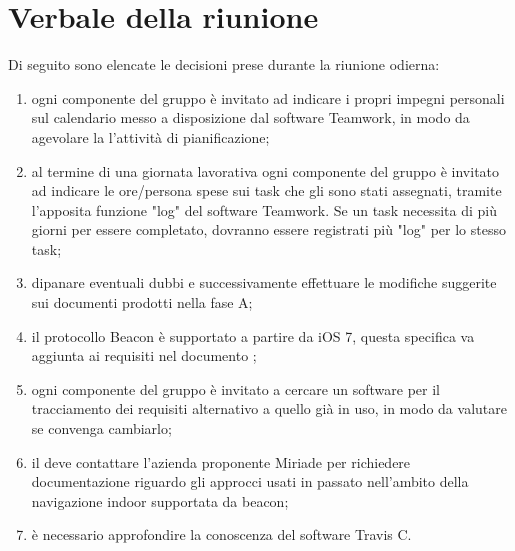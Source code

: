 \documentclass[../RiunioneInterna16-02-19.tex]{subfiles}
\begin{document}
\section{Verbale della riunione}
Di seguito sono elencate le decisioni prese durante la riunione odierna:
\begin{enumerate}
	\item ogni componente del gruppo è invitato ad indicare i propri impegni personali sul calendario messo a disposizione dal software Teamwork, in modo da agevolare la l'attività di pianificazione;
	\item al termine di una giornata lavorativa ogni componente del gruppo è invitato ad indicare le ore/persona spese sui task che gli sono stati assegnati, tramite l'apposita funzione "log" del software Teamwork. 
	Se un task necessita di più giorni per essere completato, dovranno essere registrati più "log" per lo stesso task;
	\item dipanare eventuali dubbi e successivamente effettuare le modifiche suggerite sui documenti prodotti nella fase A;
	\item il protocollo Beacon è supportato a partire da iOS 7, questa specifica va aggiunta ai requisiti nel documento \analisideirequisiti ;
	\item ogni componente del gruppo è invitato a cercare un software per il tracciamento dei requisiti alternativo a quello già in uso, in modo da valutare se convenga cambiarlo;
	\item il \responsabilediprogetto deve contattare l'azienda proponente Miriade per richiedere documentazione riguardo gli approcci usati in passato nell'ambito della navigazione indoor supportata da beacon;
	\item è necessario approfondire la conoscenza del software Travis C.
	
\end{enumerate}
\end{document}
